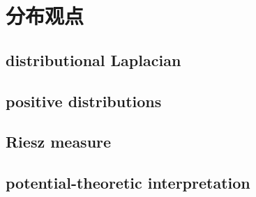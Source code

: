\section{分布观点}
\label{b3:sec:1504}


\subsection{distributional Laplacian}
\label{b3:subsec:150401}

\subsection{positive distributions}
\label{b3:subsec:150402}

\subsection{Riesz measure}
\label{b3:subsec:150403}

\subsection{potential-theoretic interpretation}
\label{b3:subsec:150404}


